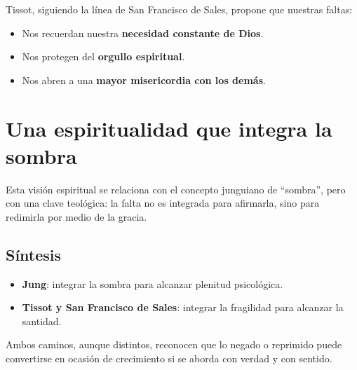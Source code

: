 \documentclass[12pt]{article}
\begin{document}
Tissot, siguiendo la línea de San Francisco de Sales, propone que nuestras faltas:
\begin{itemize}
    \item Nos recuerdan nuestra \textbf{necesidad constante de Dios}.
    \item Nos protegen del \textbf{orgullo espiritual}.
    \item Nos abren a una \textbf{mayor misericordia con los demás}.
\end{itemize}

\section*{Una espiritualidad que integra la sombra}

Esta visión espiritual se relaciona con el concepto junguiano de “sombra”, pero con una clave teológica: la falta no es integrada para afirmarla, sino para redimirla por medio de la gracia.

\subsection*{Síntesis}

\begin{itemize}
    \item \textbf{Jung}: integrar la sombra para alcanzar plenitud psicológica.
    \item \textbf{Tissot y San Francisco de Sales}: integrar la fragilidad para alcanzar la santidad.
\end{itemize}

Ambos caminos, aunque distintos, reconocen que lo negado o reprimido puede convertirse en ocasión de crecimiento si se aborda con verdad y con sentido.
\end{document}
